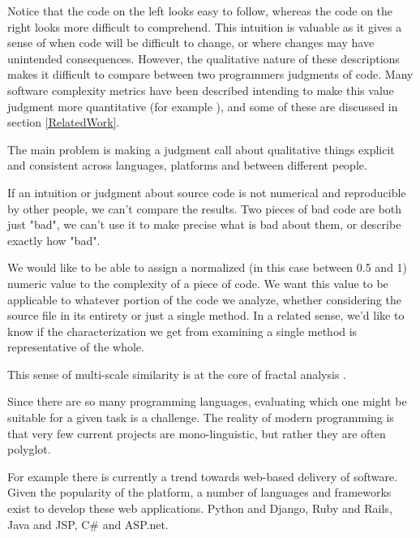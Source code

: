 \documentclass[12pt]{article}
\begin{document}
Notice that the code on the left looks easy to follow, whereas the code on the right looks more difficult to comprehend.
This intuition is valuable as it gives a sense of when code will be difficult to change, or where changes may have unintended consequences.  However, the qualitative nature of these descriptions makes it difficult to compare between two programmers judgments of code.  Many software complexity metrics have been described intending to make this value judgment more quantitative (for example \cite{Radjenovic:SoftwareMetrics:13, McCabe:SoftwareComplexity:76, Concas:FractalSoftware:06, Valverde:SmallWorlds:03}), and some of these are discussed in section \ref{RelatedWork}.


The main problem is making a judgment call about qualitative things explicit and consistent across languages, platforms and between different people.

If an intuition or judgment about source code is not numerical and reproducible by other people, we can't compare the results.  Two pieces of bad code are both just "bad", we can't use it to make precise what is bad about them, or describe exactly how "bad".

We would like to be able to assign a normalized (in this case between 0.5 and 1) numeric value to the complexity of a piece of code.  We want this value to be applicable to whatever portion of the code we analyze, whether considering the source file in its entirety or just a single method.  In a related sense, we'd like to know if the characterization we get from examining a single method is representative of the whole.

This sense of multi-scale similarity is at the core of fractal analysis \cite{Peitgen:FractalsForClassroom:91}
\cite{Kantelhardt:DFA:01}.

Since there are so many programming languages, evaluating which one might be suitable for a given task is a challenge.  The reality of modern programming is that very few current projects are mono-linguistic, but rather they are often polyglot.

For example there is currently a trend towards web-based delivery of software.  Given the popularity of the platform, a number of languages and frameworks exist to develop these web applications.  Python and Django, Ruby and Rails, Java and JSP, C\# and ASP.net.  
\end{document}
